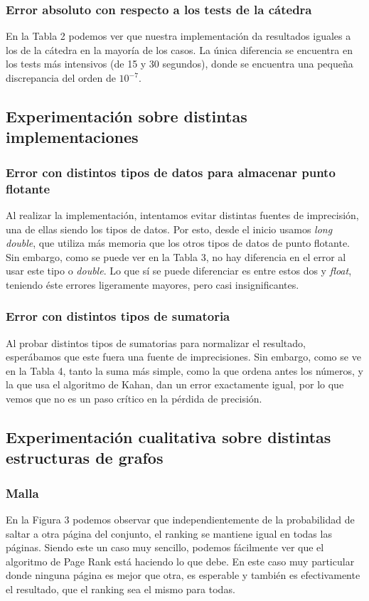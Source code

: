 \subsubsection{Error absoluto con respecto a los tests de la cátedra}
En la Tabla 2 podemos ver que nuestra implementación da resultados iguales a los de la cátedra en la mayoría de los casos. La única diferencia se encuentra en los tests más intensivos (de 15 y 30 segundos), donde se encuentra una pequeña discrepancia del orden de $10^{-7}$.


\subsection{Experimentación sobre distintas implementaciones}
\subsubsection{Error con distintos tipos de datos para almacenar punto flotante}
Al realizar la implementación, intentamos evitar distintas fuentes de imprecisión, una de ellas siendo los tipos de datos. Por esto, desde el inicio usamos \textit{long double}, que utiliza más memoria que los otros tipos de datos de punto flotante. Sin embargo, como se puede ver en la Tabla 3, no hay diferencia en el error al usar este tipo o \textit{double}. Lo que sí se puede diferenciar es entre estos dos y \textit{float}, teniendo éste errores ligeramente mayores, pero casi insignificantes.

\subsubsection{Error con distintos tipos de sumatoria}
Al probar distintos tipos de sumatorias para normalizar el resultado, esperábamos que este fuera una fuente de imprecisiones. Sin embargo, como se ve en la Tabla 4, tanto la suma más simple, como la que ordena antes los números, y la que usa el algoritmo de Kahan, dan un error exactamente igual, por lo que vemos que no es un paso crítico en la pérdida de precisión.


\subsection{Experimentación cualitativa sobre distintas estructuras de grafos}
\subsubsection{Malla}
En la Figura 3 podemos observar que independientemente de la probabilidad de saltar a otra página del conjunto, el ranking se mantiene igual en todas las páginas.
Siendo este un caso muy sencillo, podemos fácilmente ver que el algoritmo de Page Rank está haciendo lo que debe.
En este caso muy particular donde ninguna página es mejor que otra, es esperable y también es efectivamente el resultado, que el ranking sea el mismo para todas.

